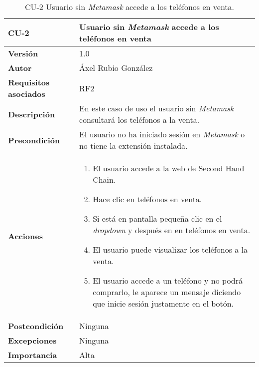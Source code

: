 \begin{table}[p]
	\centering
	\begin{tabularx}{\linewidth}{ p{} p{} }
		\toprule
		\textbf{CU-2}    & \textbf{Usuario sin \textit{Metamask} accede a los teléfonos en venta}\\
		\toprule
		\textbf{Versión}              & 1.0    \\
		\textbf{Autor}                & Áxel Rubio González \\
		\textbf{Requisitos asociados} & RF2 \\
		\textbf{Descripción}          & En este caso de uso el usuario sin \textit{Metamask} consultará los teléfonos a la venta.  \\
		\textbf{Precondición}         & El usuario no ha iniciado sesión en \textit{Metamask} o no tiene la extensión instalada. \\
		\textbf{Acciones}             &
		\begin{enumerate}
			\def\labelenumi{\arabic{enumi}.}
			\tightlist
			\item El usuario accede a la web de Second Hand Chain.
			\item Hace clic en teléfonos en venta.
                \item Si está en pantalla pequeña clic en el \textit{dropdown} y después en en teléfonos en venta.
                \item El usuario puede visualizar los teléfonos a la venta.
                \item El usuario accede a un teléfono y no podrá comprarlo, le aparece un mensaje diciendo que inicie sesión justamente en el botón.
		\end{enumerate}\\
		\textbf{Postcondición}        & Ninguna \\
		\textbf{Excepciones}          & Ninguna \\
		\textbf{Importancia}          & Alta \\
		\bottomrule
	\end{tabularx}
	\caption{CU-2 Usuario sin \textit{Metamask} accede a los teléfonos en venta.}
\end{table}


